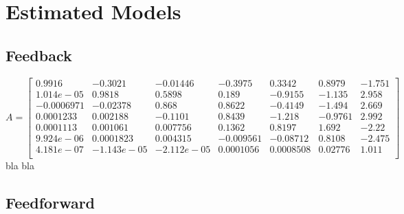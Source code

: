 \section{Estimated Models}\label{c:datasheets}

\subsection{Feedback}

\[ A = 
\begin{bmatrix}

        0.9916  &   -0.3021  &  -0.01446  &   -0.3975  &    0.3342  &    0.8979   &   -1.751\\
    1.014e-05 &     0.9818   &   0.5898   &    0.189  &   -0.9155   &   -1.135   &    2.958\\
    -0.0006971 &   -0.02378  &     0.868   &   0.8622  &   -0.4149  &    -1.494   &    2.669\\
    0.0001233  &  0.002188   &  -0.1101  &    0.8439  &    -1.218  &   -0.9761    &   2.992\\
      0.0001113 &   0.001061 &   0.007756   &   0.1362  &    0.8197   &    1.692    &   -2.22\\
      9.924e-06 &  0.0001823 &   0.004315  &  -0.009561 &   -0.08712  &    0.8108   &   -2.475\\
     4.181e-07 & -1.143e-05 & -2.112e-05  &  0.0001056 &  0.0008508  &   0.02776  &     1.011\\

\end{bmatrix}
\]
bla bla





\subsection{Feedforward}























%

%
%
%

%
%
%
 
 
 

